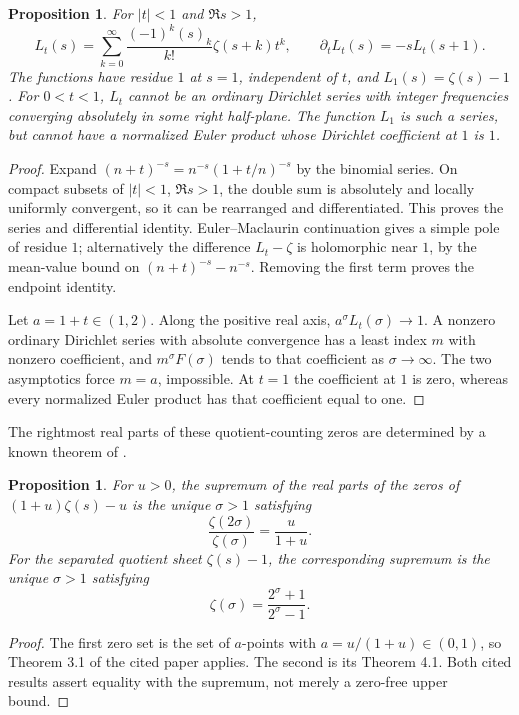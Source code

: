 \documentclass[11pt]{article}
\newtheorem{proposition}[theorem]{Proposition}
\theoremstyle{definition}\newtheorem{definition}[theorem]{Definition}
\begin{document}
\begin{proposition}\label{prop:shift}
For $|t|<1$ and $\Re s>1$,
\[
 L_t(s)=\sum_{k=0}^{\infty}\frac{(-1)^k(s)_k}{k!}
                         \zeta(s+k)t^k,
 \qquad \partial_t L_t(s)=-sL_t(s+1).
\]
The functions have residue $1$ at $s=1$, independent of $t$, and $L_1(s)=\zeta(s)-1$. For $0<t<1$, $L_t$ cannot be an ordinary Dirichlet series with integer frequencies converging absolutely in some right half-plane. The function $L_1$ is such a series, but cannot have a normalized Euler product whose Dirichlet coefficient at $1$ is $1$.
\end{proposition}
\begin{proof}
Expand $(n+t)^{-s}=n^{-s}(1+t/n)^{-s}$ by the binomial series. On compact subsets of $|t|<1$, $\Re s>1$, the double sum is absolutely and locally uniformly convergent, so it can be rearranged and differentiated. This proves the series and differential identity. Euler--Maclaurin continuation gives a simple pole of residue $1$; alternatively the difference $L_t-\zeta$ is holomorphic near $1$, by the mean-value bound on $(n+t)^{-s}-n^{-s}$. Removing the first term proves the endpoint identity.

Let $a=1+t\in(1,2)$. Along the positive real axis, $a^{\sigma}L_t(\sigma)\to1$. A nonzero ordinary Dirichlet series with absolute convergence has a least index $m$ with nonzero coefficient, and $m^{\sigma}F(\sigma)$ tends to that coefficient as $\sigma\to\infty$. The two asymptotics force $m=a$, impossible. At $t=1$ the coefficient at $1$ is zero, whereas every normalized Euler product has that coefficient equal to one.
\end{proof}

The rightmost real parts of these quotient-counting zeros are determined by a known theorem of \citet[Theorems 3.1 and 4.1, pp.~4--5]{AriasLune}.
\begin{proposition}\label{prop:quotient-apoint-bound}
For $u>0$, the supremum of the real parts of the zeros of $(1+u)\zeta(s)-u$ is the unique $\sigma>1$ satisfying
\[
 \frac{\zeta(2\sigma)}{\zeta(\sigma)}=\frac{u}{1+u}.
\]
For the separated quotient sheet $\zeta(s)-1$, the corresponding supremum is the unique $\sigma>1$ satisfying
\[
 \zeta(\sigma)=\frac{2^\sigma+1}{2^\sigma-1}.
\]
\end{proposition}
\begin{proof}
The first zero set is the set of $a$-points with $a=u/(1+u)\in(0,1)$, so Theorem 3.1 of the cited paper applies. The second is its Theorem 4.1. Both cited results assert equality with the supremum, not merely a zero-free upper bound.
\end{proof}
\end{document}
